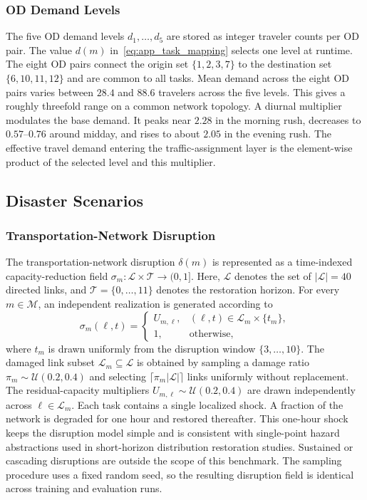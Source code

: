\subsubsection{OD Demand Levels}
\label{app:demand}

The five OD demand levels $d_1,\dots,d_5$ are stored as integer traveler counts per OD pair. The value $d(m)$ in~\eqref{eq:app_task_mapping} selects one level at runtime. The eight OD pairs connect the origin set $\{1,2,3,7\}$ to the destination set $\{6,10,11,12\}$ and are common to all tasks. Mean demand across the eight OD pairs varies between $28.4$ and $88.6$ travelers across the five levels. This gives a roughly threefold range on a common network topology. A diurnal multiplier modulates the base demand. It peaks near $2.28$ in the morning rush, decreases to $0.57$--$0.76$ around midday, and rises to about $2.05$ in the evening rush. The effective travel demand entering the traffic-assignment layer is the element-wise product of the selected level and this multiplier.

\subsection{Disaster Scenarios}
\label{app:scenarios}

\subsubsection{Transportation-Network Disruption}
\label{app:delta}

The transportation-network disruption $\delta(m)$ is represented as a time-indexed capacity-reduction field $\sigma_{m}:\mathcal{L}\times\mathcal{T}\to(0,1]$. Here, $\mathcal{L}$ denotes the set of $\lvert\mathcal{L}\rvert = 40$ directed links, and $\mathcal{T}=\{0,\dots,11\}$ denotes the restoration horizon. For every $m\in\mathcal{M}$, an independent realization is generated according to
\begin{equation}
\label{eq:app_disruption_generator}
\sigma_m(\ell,t) = \begin{cases}
U_{m,\ell}, & (\ell,t)\in\mathcal{L}_m\times\{t_m\},\\
1, & \text{otherwise},
\end{cases}
\end{equation}
where $t_m$ is drawn uniformly from the disruption window $\{3,\dots,10\}$. The damaged link subset $\mathcal{L}_m\subseteq\mathcal{L}$ is obtained by sampling a damage ratio $\pi_m\sim\mathcal{U}(0.2,0.4)$ and selecting $\lceil\pi_m\lvert\mathcal{L}\rvert\rceil$ links uniformly without replacement. The residual-capacity multipliers $U_{m,\ell}\sim\mathcal{U}(0.2,0.4)$ are drawn independently across $\ell\in\mathcal{L}_m$. Each task contains a single localized shock. A fraction of the network is degraded for one hour and restored thereafter. This one-hour shock keeps the disruption model simple and is consistent with single-point hazard abstractions used in short-horizon distribution restoration studies. Sustained or cascading disruptions are outside the scope of this benchmark. The sampling procedure uses a fixed random seed, so the resulting disruption field is identical across training and evaluation runs.


